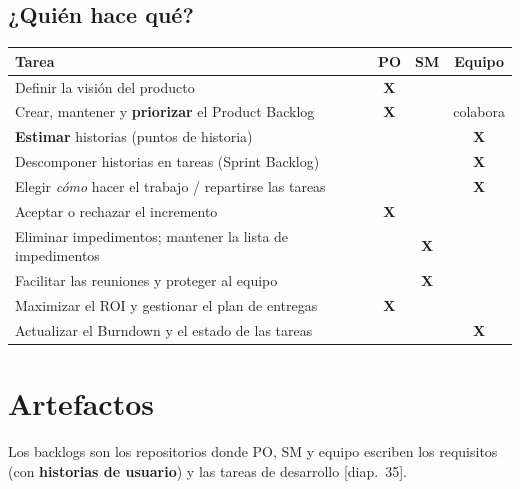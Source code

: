 \documentclass[11pt,a4paper,oneside,openany]{report}
\newcommand{\diap}[1]{\textcolor{mdaPrimary}{\small[diap.~#1]}}
\begin{document}
\subsection{¿Quién hace qué?}
\begin{center}\small
\begin{tabular}{p{6.3cm}ccc}
\toprule
\textbf{Tarea} & \textbf{PO} & \textbf{SM} & \textbf{Equipo} \\ \midrule
Definir la visión del producto & \textbf{X} & & \\
Crear, mantener y \textbf{priorizar} el Product Backlog & \textbf{X} & & colabora \\
\textbf{Estimar} historias (puntos de historia) & & & \textbf{X} \\
Descomponer historias en tareas (Sprint Backlog) & & & \textbf{X} \\
Elegir \emph{cómo} hacer el trabajo / repartirse las tareas & & & \textbf{X} \\
Aceptar o rechazar el incremento & \textbf{X} & & \\
Eliminar impedimentos; mantener la lista de impedimentos & & \textbf{X} & \\
Facilitar las reuniones y proteger al equipo & & \textbf{X} & \\
Maximizar el ROI y gestionar el plan de entregas & \textbf{X} & & \\
Actualizar el Burndown y el estado de las tareas & & & \textbf{X} \\
\bottomrule
\end{tabular}
\end{center}

\section{Artefactos}
Los backlogs son los repositorios donde PO, SM y equipo escriben los requisitos (con \textbf{historias de usuario})
y las tareas de desarrollo \diap{35}.
\end{document}
